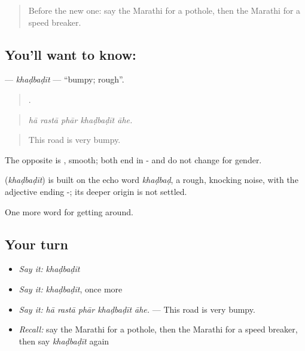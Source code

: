 \label{lesson:MR-C403-khadbadit}



\begin{quote}
Before the new one: say the Marathi for a pothole, then the Marathi for a speed breaker.
\end{quote}

\subsection*{You'll want to know: }
\textbf{} — \emph{khaḍbaḍīt} — \textquotedblleft{}bumpy; rough\textquotedblright{}.

\begin{quote}
    .
\end{quote}

\begin{quote}
\emph{hā rastā phār khaḍbaḍīt āhe.}
\end{quote}

\begin{quote}
This road is very bumpy.
\end{quote}

The opposite is , smooth; both end in - and do not change for gender.

\begin{cousinweb}
\textbf{} (\emph{khaḍbaḍīt}) is built on the echo word \emph{khaḍbaḍ}, a rough, knocking noise, with the adjective ending -; its deeper origin is not settled.
\end{cousinweb}

\begin{grammarlens}[title={What you've built}]
One more word for getting around.
\end{grammarlens}

\subsection*{Your turn}
\begin{itemize}
\raggedright
  \item \emph{Say it:} \emph{khaḍbaḍīt}
  \item \emph{Say it:} \emph{khaḍbaḍīt}, once more
  \item \emph{Say it:} \emph{hā rastā phār khaḍbaḍīt āhe.} — This road is very bumpy.
  \item \emph{Recall:} say the Marathi for a pothole, then the Marathi for a speed breaker, then say \emph{khaḍbaḍīt} again
\end{itemize}

